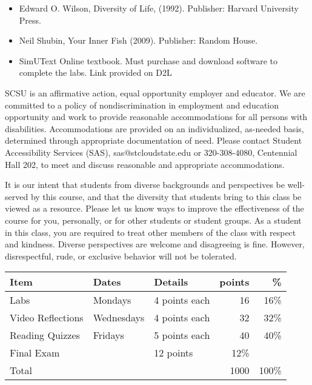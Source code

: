 \documentclass{tufte-handout}
\begin{document}
\begin{fullwidth}
\begin{itemize}
	\item Edward O. Wilson, Diversity of Life, (1992). Publisher: Harvard University Press.
	\item Neil Shubin, Your Inner Fish (2009). Publisher: Random House.
	\item SimUText Online textbook. Must purchase and download software to complete the labs. Link provided on D2L
\end{itemize}


\newpage


 SCSU is an affirmative action, equal opportunity employer and educator. We are committed to a policy of nondiscrimination in employment and education opportunity and work to provide reasonable accommodations for all persons with disabilities. Accommodations are provided on an individualized, as-needed basis, determined through appropriate documentation of need. Please contact Student Accessibility Services (SAS), sas@stcloudstate.edu or 320-308-4080, Centennial Hall 202, to meet and discuss reasonable and appropriate accommodations. 

 It is our intent that students from diverse backgrounds and perspectives be well-served by this course, and that the diversity that students bring to this class be viewed as a resource. Please let us know ways to improve the effectiveness of the course for you, personally, or for other students or student groups. As a student in this class, you are required to treat other members of the class with respect and kindness. Diverse perspectives are welcome and disagreeing is fine. However, disrespectful, rude, or exclusive behavior will not be tolerated.




\end{fullwidth}




\begin{table}
\begin{tabular}{l l l r r }
Item & Dates & Details & points &  \% \\
\hline
Labs & Mondays & 4 points each & 16 & 16\% \\
Video Reflections  & Wednesdays & 4 points each & 32 & 32\% \\
Reading Quizzes & Fridays & 5 points each & 40 & 40\% \\
Final Exam & & 12 points & 12\% \\
\hline
Total & & & 1000 & 100\% \\
\end{tabular}
\end{table}
\end{document}
